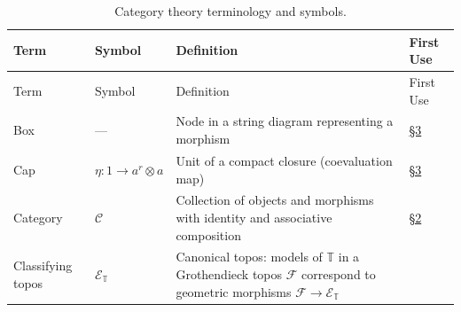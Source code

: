 \documentclass[
]{article}
\begin{document}
\begin{longtable}[]{@{}
  >{\raggedright\arraybackslash}p{}
  >{\centering\arraybackslash}p{}
  >{\raggedright\arraybackslash}p{}
  >{\centering\arraybackslash}p{}@{}}
\caption{Category theory terminology and
symbols.}\label{tbl:not-category}\tabularnewline
\toprule\noalign{}
\begin{minipage}[b]{\linewidth}\raggedright
Term
\end{minipage} & \begin{minipage}[b]{\linewidth}\centering
Symbol
\end{minipage} & \begin{minipage}[b]{\linewidth}\raggedright
Definition
\end{minipage} & \begin{minipage}[b]{\linewidth}\centering
First Use
\end{minipage} \\
\midrule\noalign{}
\endfirsthead
\toprule\noalign{}
\begin{minipage}[b]{\linewidth}\raggedright
Term
\end{minipage} & \begin{minipage}[b]{\linewidth}\centering
Symbol
\end{minipage} & \begin{minipage}[b]{\linewidth}\raggedright
Definition
\end{minipage} & \begin{minipage}[b]{\linewidth}\centering
First Use
\end{minipage} \\
\midrule\noalign{}
\endhead
\bottomrule\noalign{}
\endlastfoot
Box & --- & Node in a string diagram representing a morphism &
\href{03_categorial_grammar.md\#sec:categorial-grammar}{§3} \\
Cap & \(\eta: 1 \to a^r \otimes a\) & Unit of a compact closure
(coevaluation map) &
\href{03_categorial_grammar.md\#sec:categorial-grammar}{§3} \\
Category & \(\mathcal{C}\) & Collection of objects and morphisms with
identity and associative composition &
\href{02_case_systems.md\#sec:case-systems}{§2} \\
Classifying topos & \(\mathcal{E}_{\mathbb{T}}\) & Canonical topos:
models of \(\mathbb{T}\) in a Grothendieck topos \(\mathcal{F}\)
correspond to geometric morphisms
\(\mathcal{F} \to \mathcal{E}_{\mathbb{T}}\) &

\end{longtable}
\end{document}
